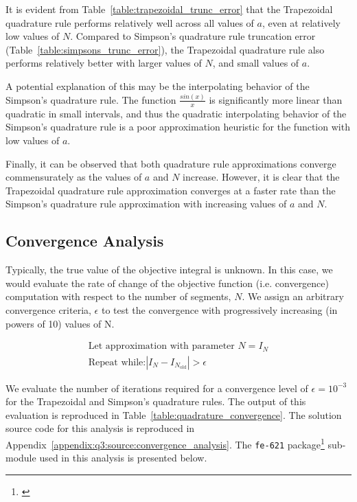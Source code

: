 \documentclass[10pt]{article}
\begin{document}
    It is evident from Table~\ref{table:trapezoidal_trunc_error} that the Trapezoidal quadrature rule performs relatively well across all values of $a$, even at relatively low values of $N$. Compared to Simpson's quadrature rule truncation error (Table~\ref{table:simpsons_trunc_error}), the Trapezoidal quadrature rule also performs relatively better with larger values of $N$, and small values of $a$.
    
    A potential explanation of this may be the interpolating behavior of the Simpson's quadrature rule. The function $\frac{sin{(x)}}{x}$ is significantly more linear than quadratic in small intervals, and thus the quadratic interpolating behavior of the Simpson's quadrature rule is a poor approximation heuristic for the function with low values of $a$.

    Finally, it can be observed that both quadrature rule approximations converge commensurately as the values of $a$ and $N$ increase. However, it is clear that the Trapezoidal quadrature rule approximation converges at a faster rate than the Simpson's quadrature rule approximation with increasing values of $a$ and $N$.


    \subsection{Convergence Analysis} 

    Typically, the true value of the objective integral is unknown. In this case, we would evaluate the rate of change of the objective function (i.e. convergence) computation with respect to the number of segments, $N$. We assign an arbitrary convergence criteria, $\epsilon$ to test the convergence with progressively increasing (in powers of 10) values of N.

    \begin{gather*}
        \text{Let approximation with parameter $N$} = I_N \\
        \text{Repeat while:} \left| I_N - I_{N_\text{old}} \right| > \epsilon
    \end{gather*}

    We evaluate the number of iterations required for a convergence level of $\epsilon = 10^{-3}$ for the Trapezoidal and Simpson's quadrature rules. The output of this evaluation is reproduced in Table~\ref{table:quadrature_convergence}. The solution source code for this analysis is reproduced in Appendix~\ref{appendix:q3:source:convergence_analysis}. The \texttt{fe-621} package\footnote{\cite{Weerawarana2019}} sub-module used in this analysis is presented below.
\end{document}
